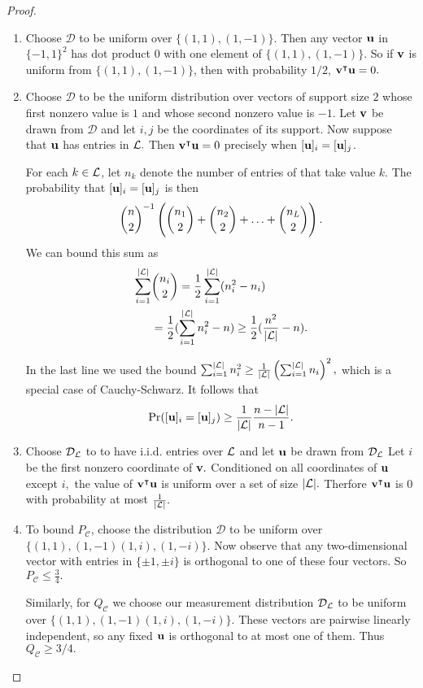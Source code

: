\begin{proof}
\begin{enumerate}

\item Choose $\mathcal{D}$ to be uniform over $\{(1,1), (1,-1)\}.$ Then any vector $\boldsymbol{\mathrm{u}}$ in $\{-1,1\}^2$ has dot product $0$ with one element of $\{(1,1), (1,-1)\}.$ So if $\boldsymbol{\mathrm{v}}$ is uniform from $\{(1,1), (1,-1)\}$, then with probability $1/2$, $\boldsymbol{\mathrm{v}}^\intercal \boldsymbol{\mathrm{u}} = 0.$

\item Choose $\mathcal{D}$ to be the uniform distribution over vectors of support size $2$ whose first nonzero value is $1$ and whose second nonzero value is $-1$.
Let $\boldsymbol{\mathrm{v}}$ be drawn from $\mathcal{D}$ and let $i,j$ be the coordinates of its support. Now suppose that $\boldsymbol{\mathrm{u}}$ has entries in ${\mathcal L}.$  Then $\boldsymbol{\mathrm{v}}^\intercal \boldsymbol{\mathrm{u}} = 0$ precisely when $[\boldsymbol{\mathrm{u}}]_i = [\boldsymbol{\mathrm{u}}]_j$.

For each \(k\in{\mathcal L}\), let \(n_k\) denote the number of entries of \vu that take value \(k\).
The probability that $[\boldsymbol{\mathrm{u}}]_i = [\boldsymbol{\mathrm{u}}]_j$ is then
\[
\dbinom{n}{2}^{-1}\left(\dbinom{n_1}{2} + \dbinom{n_2}{2} + \ldots + \dbinom{n_L}{2}\right).
\]
We can bound this sum as
\begin{align*}
\sum_{i=1}^{\abs{\alphabet}} &\dbinom{n_i}{2} 
= \frac{1}{2}\sum_{i=1}^{\abs{\alphabet}} (n_i^2 - n_i) \\
&= \frac{1}{2}(\sum_{i=1}^{\abs{\alphabet}} n_i^2 - n)%
\geq \frac{1}{2}(\frac{n^2}{{\abs{\alphabet}}} - n).
\end{align*}

In the last line we used the bound 
\(
\sum_{i=1}^{\vert{\ensuremath{{\mathcal L}}}\vert} n_i^2 \geq \frac{1}{\vert{\ensuremath{{\mathcal L}}}\vert}\left( \sum_{i=1}^{\vert{\ensuremath{{\mathcal L}}}\vert} {n_i}\right)^2,
\)
which is a special case of Cauchy-Schwarz.
% 
It follows that
\[
\Pr([\boldsymbol{\mathrm{u}}]_i = [\boldsymbol{\mathrm{u}}]_j) \geq \frac{1}{{\vert{\ensuremath{{\mathcal L}}}\vert}}\frac{n-{\vert{\ensuremath{{\mathcal L}}}\vert}}{n-1}.
\]

\item Choose $\mathcal{D}_{{\mathcal L}}$ to to have i.i.d. entries over ${\mathcal L}$ and let $\boldsymbol{\mathrm{u}}$ be drawn from $\mathcal{D}_{{\mathcal L}}$  Let $i$ be the first nonzero coordinate of $\boldsymbol{\mathrm{v}}.$ Conditioned on all coordinates of $\boldsymbol{\mathrm{u}}$ except $i,$ the value of $\boldsymbol{\mathrm{v}}^\intercal \boldsymbol{\mathrm{u}}$ is uniform over a set of size $\vert{\ensuremath{{\mathcal L}}}\vert.$ Therfore $\boldsymbol{\mathrm{v}}^\intercal \boldsymbol{\mathrm{u}}$ is $0$ with probability at most $\frac{1}{\vert{\ensuremath{{\mathcal L}}}\vert}.$

\item To bound $P_{\mathcal{C}}$, choose the distribution $\mathcal{D}$ to be uniform over $\{(1,1), (1,-1) (1,i), (1,-i)\}.$  Now observe that any two-dimensional vector with entries in $\{\pm 1, \pm i\}$ is orthogonal to one of these four vectors.  So $P_{\mathcal{C}} \leq \frac{3}{4}.$

Similarly, for $Q_{\mathcal{C}}$ we choose our measurement distribution $\mathcal{D}_{{\mathcal L}}$ to be uniform over $\{(1,1), (1,-1) (1,i), (1,-i)\}.$ These vectors are pairwise linearly independent, so any fixed $\boldsymbol{\mathrm{u}}$ is orthogonal to at most one of them.  Thus $Q_{\mathcal{C}} \geq 3/4.$

\end{enumerate}
\end{proof}


